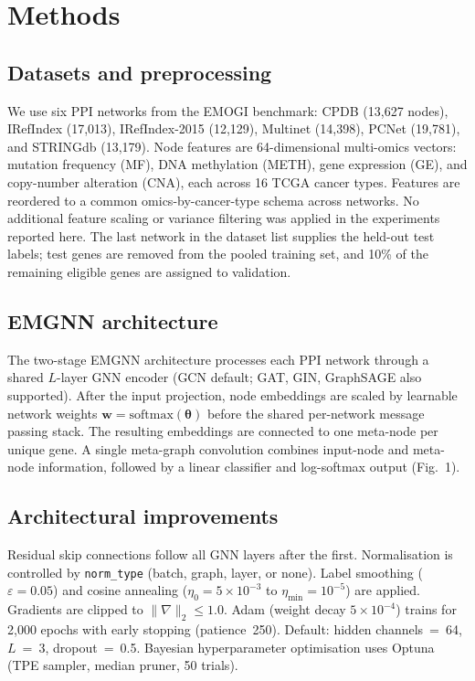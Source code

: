 
\section{Methods}

\subsection{Datasets and preprocessing}

We use six PPI networks from the EMOGI benchmark\cite{emogi2021}: CPDB (13,627 nodes),
IRefIndex (17,013), IRefIndex-2015 (12,129), Multinet (14,398), PCNet (19,781), and
STRINGdb (13,179). Node features are 64-dimensional multi-omics vectors: mutation
frequency (MF), DNA methylation (METH), gene expression (GE), and copy-number alteration
(CNA), each across 16 TCGA cancer types. Features are reordered to a common
omics-by-cancer-type schema across networks. No additional feature scaling or variance
filtering was applied in the experiments reported here. The last network in the dataset
list supplies the held-out test labels; test genes are removed from the pooled training
set, and 10\% of the remaining eligible genes are assigned to validation.

\subsection{EMGNN architecture}

The two-stage EMGNN architecture\cite{emgnn2023} processes each PPI network through a
shared $L$-layer GNN encoder (GCN default\cite{gcn2017}; GAT\cite{gat2018},
GIN\cite{gin2019}, GraphSAGE\cite{sage2017} also supported). After the input projection,
node embeddings are scaled by learnable network weights
$\mathbf{w}=\mathrm{softmax}(\boldsymbol{\theta})$ before the shared per-network message
passing stack. The resulting embeddings are connected to one meta-node per unique gene.
A single meta-graph convolution combines input-node and meta-node information, followed
by a linear classifier and log-softmax output (Fig.~1).

\subsection{Architectural improvements}

Residual skip connections\cite{resnet2016} follow all GNN layers after the first.
Normalisation is controlled by \texttt{norm\_type} (batch, graph\cite{graphnorm2021},
layer, or none). Label smoothing ($\varepsilon = 0.05$) and cosine
annealing\cite{cosine2017} ($\eta_0 = 5\times10^{-3}$ to $\eta_{\min} = 10^{-5}$) are
applied. Gradients are clipped to $\|\nabla\|_2 \le 1.0$. Adam\cite{kingma2014adam}
(weight decay $5\times10^{-4}$) trains for 2,000 epochs with early stopping
(patience~250). Default: hidden channels~=~64, $L$~=~3, dropout~=~0.5. Bayesian
hyperparameter optimisation uses Optuna (TPE sampler, median pruner, 50 trials).

